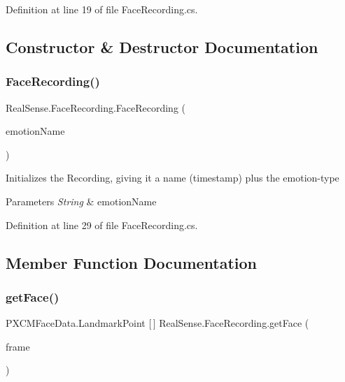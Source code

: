 Definition at line 19 of file Face\+Recording.\+cs.



\subsection{Constructor \& Destructor Documentation}
\mbox{\label{class_real_sense_1_1_face_recording_a06fe1ad41d77cd359dd583c70d1f6e35}} 
\subsubsection{\texorpdfstring{Face\+Recording()}{FaceRecording()}}
{\footnotesize\ttfamily Real\+Sense.\+Face\+Recording.\+Face\+Recording (\begin{DoxyParamCaption}\item[{String}]{emotion\+Name }\end{DoxyParamCaption})}

Initializes the Recording, giving it a name (timestamp) plus the emotion-\/type 
\begin{DoxyParams}{Parameters}
{\em String} & emotion\+Name \\
\hline
\end{DoxyParams}


Definition at line 29 of file Face\+Recording.\+cs.



\subsection{Member Function Documentation}
\mbox{\label{class_real_sense_1_1_face_recording_a8a5e0b5187f8f71e490c612289df757f}} 
\subsubsection{\texorpdfstring{get\+Face()}{getFace()}}
{\footnotesize\ttfamily P\+X\+C\+M\+Face\+Data.\+Landmark\+Point \mbox{[}$\,$\mbox{]} Real\+Sense.\+Face\+Recording.\+get\+Face (\begin{DoxyParamCaption}\item[{int}]{frame }\end{DoxyParamCaption})}


